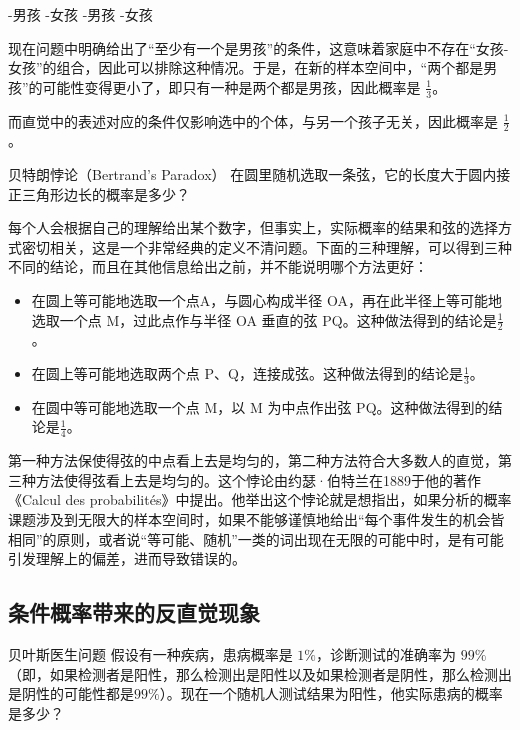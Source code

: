 \begin{itemize}
-男孩
-女孩
-男孩
-女孩
\end{itemize}

现在问题中明确给出了“至少有一个是男孩”的条件，这意味着家庭中不存在“女孩-女孩”的组合，因此可以排除这种情况。于是，在新的样本空间中，“两个都是男孩”的可能性变得更小了，即只有一种是两个都是男孩，因此概率是 $\displaystyle\frac{1}{3}$。

而直觉中的表述对应的条件仅影响选中的个体，与另一个孩子无关，因此概率是 $\displaystyle\frac{1}{2}$。

\begin{example}{贝特朗悖论（Bertrand's Paradox）}
在圆里随机选取一条弦，它的长度大于圆内接正三角形边长的概率是多少？
\end{example}

每个人会根据自己的理解给出某个数字，但事实上，实际概率的结果和弦的选择方式密切相关，这是一个非常经典的定义不清问题。下面的三种理解，可以得到三种不同的结论，而且在其他信息给出之前，并不能说明哪个方法更好：

\begin{itemize}
\item 在圆上等可能地选取一个点A，与圆心构成半径 OA，再在此半径上等可能地选取一个点 M，过此点作与半径 OA 垂直的弦 PQ。这种做法得到的结论是$\displaystyle\frac{1}{2}$。
\item 在圆上等可能地选取两个点 P、Q，连接成弦。这种做法得到的结论是$\displaystyle\frac{1}{3}$。
\item 在圆中等可能地选取一个点 M，以 M 为中点作出弦 PQ。这种做法得到的结论是$\displaystyle\frac{1}{4}$。
\end{itemize}

第一种方法保使得弦的中点看上去是均匀的，第二种方法符合大多数人的直觉，第三种方法使得弦看上去是均匀的。这个悖论由约瑟·伯特兰在1889于他的著作《Calcul des probabilités》中提出。他举出这个悖论就是想指出，如果分析的概率课题涉及到无限大的样本空间时，如果不能够谨慎地给出“每个事件发生的机会皆相同”的原则，或者说“等可能、随机”一类的词出现在无限的可能中时，是有可能引发理解上的偏差，进而导致错误的。

\subsection{条件概率带来的反直觉现象}

\begin{example}{贝叶斯医生问题}
假设有一种疾病，患病概率是 $1\%$，诊断测试的准确率为 $99\%$（即，如果检测者是阳性，那么检测出是阳性以及如果检测者是阴性，那么检测出是阴性的可能性都是$99\%$）。现在一个随机人测试结果为阳性，他实际患病的概率是多少？
\end{example}

